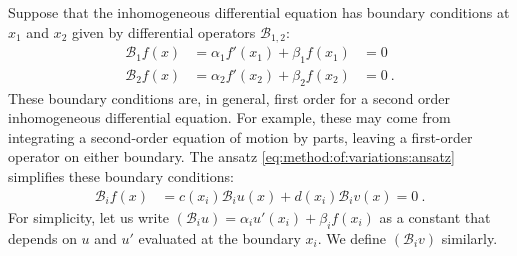 \begin{subappendices}
Suppose that the inhomogeneous differential equation has boundary conditions at $x_1$ and $x_2$ given by differential operators $\mathcal B_{1,2}$:
\begin{align}
	\mathcal B_1 f(x) &= \alpha_1 f'(x_1) + \beta_1 f(x_1) &= 0
	\\
	\mathcal B_2 f(x) &= \alpha_2 f'(x_2) + \beta_2 f(x_2) &= 0 \ .
\end{align}
These boundary conditions are, in general, first order for a second order inhomogeneous differential equation. For example, these may come from integrating a second-order equation of motion by parts, leaving a first-order operator on either boundary.
%
The ansatz \eqref{eq:method:of:variations:ansatz} simplifies these boundary conditions:
\begin{align}
	\mathcal B_i f(x) &= 
	c(x_i) \mathcal B_i u (x) 
	+
	d(x_i) \mathcal B_i v (x) 
	= 0 
	\ .
	\label{eq:method:of:variations:BC}
\end{align}
For simplicity, let us write $(\mathcal B_i u) = \alpha_i u'(x_i) + \beta_i f(x_i)$ as a constant that depends on $u$ and $u'$ evaluated at the boundary $x_i$. We define $(\mathcal B_i v)$ similarly. 


\end{subappendices}
